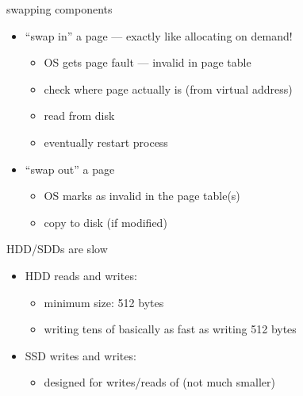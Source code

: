 \begin{frame}{swapping components}
\begin{itemize}
\item ``swap in'' a page --- exactly like allocating on demand!
\begin{itemize}
    \item OS gets page fault --- invalid in page table
    \item check where page actually is (from virtual address)
    \item read from disk
    \item eventually restart process
\end{itemize}
\item ``swap out'' a page
\begin{itemize}
    \item OS marks as invalid in the page table(s)
    \item copy to disk (if modified)
\end{itemize}
\end{itemize}
\end{frame}


\begin{frame}{HDD/SDDs are slow}
\begin{itemize}
\item HDD reads and writes: 
    \begin{itemize}
    \item minimum size: 512 bytes
    \item writing tens of  basically as fast as writing 512 bytes
    \end{itemize}
\item SSD writes and writes: 
    \begin{itemize}
    \item designed for writes/reads of  (not much smaller)
    \end{itemize}
\end{itemize}
\end{frame}
